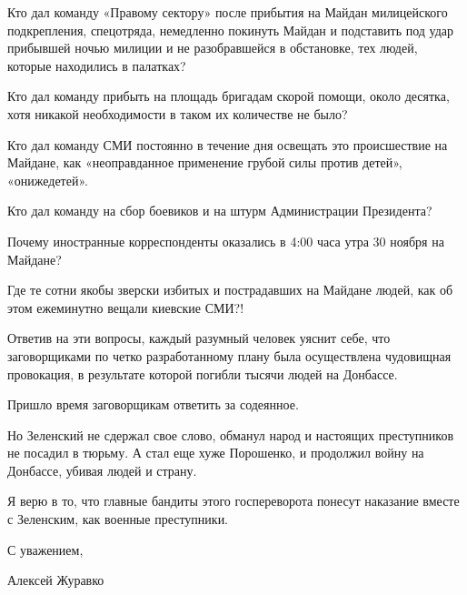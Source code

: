 Кто дал команду «Правому сектору» после прибытия на Майдан милицейского
подкрепления, спецотряда, немедленно покинуть Майдан и подставить под удар
прибывшей ночью милиции и не разобравшейся в обстановке, тех людей, которые
находились в палатках?

Кто дал команду прибыть на площадь бригадам скорой помощи, около десятка, хотя
никакой необходимости в таком их количестве не было?

Кто дал команду СМИ постоянно в течение дня освещать это происшествие на
Майдане, как «неоправданное применение грубой силы против детей», «онижедетей».

Кто дал команду на сбор боевиков и на штурм Администрации Президента?

Почему иностранные корреспонденты оказались в 4:00 часа утра 30 ноября на
Майдане?

Где те сотни якобы зверски избитых и пострадавших на Майдане людей, как об этом
ежеминутно вещали киевские СМИ?!

Ответив на эти вопросы, каждый разумный человек уяснит себе, что заговорщиками
по четко разработанному плану была осуществлена чудовищная провокация,  в
результате которой погибли тысячи людей на Донбассе. 

Пришло время заговорщикам ответить за содеянное. 

Но Зеленский не сдержал свое слово, обманул народ и настоящих преступников не
посадил в тюрьму. А стал еще хуже Порошенко, и продолжил войну на Донбассе,
убивая людей и страну.

Я верю в то, что главные бандиты этого госпереворота понесут наказание вместе с
Зеленским, как военные преступники.

С уважением, 

Алексей Журавко
